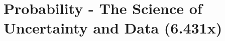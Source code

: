 \section{Probability - The Science of Uncertainty and Data (6.431x)}


\newpage
\newpage
\newpage
\newpage
\newpage
\newpage
\newpage
\newpage
\newpage

